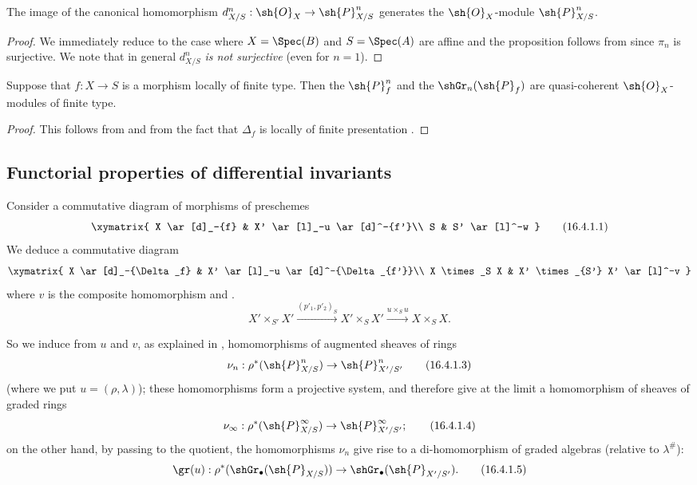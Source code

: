 \begin{proposition}[16.3.8]
\label{IV.16.3.8}
The image of the canonical homomorphism $d_{X/S}^n: \sh{O}_X \to \sh{P}_{X/S}^n$ generates the $\sh{O}_X$-module $\sh{P}_{X/S}^n$.
\end{proposition}

\begin{proof}
We immediately reduce to the case where $X = \Spec(B)$ and $S = \Spec(A)$ are affine and the proposition follows from  since $\pi_n$ is surjective.
We note that in general $d_{X/S}^n$ \emph{is not surjective} (even for $n = 1$).
\end{proof}

\begin{proposition}[16.3.9]
\label{IV.16.3.9}
Suppose that $f:X \to S$ is a morphism locally of finite type.
Then the $\sh{P}_{f}^n$ and the $\shGr_n(\sh{P}_{f})$ are quasi-coherent $\sh{O}_X$-modules of finite type.
\end{proposition}

\begin{proof}
This follows from  and from the fact that $\Delta_f$ is locally of finite presentation .
\end{proof}

\subsection{Functorial properties of differential invariants}
\label{IV.16.4}

\begin{env}[16.4.1]
\label{IV.16.4.1}
Consider a commutative diagram of morphisms of preschemes
\[
  \label{IV.16.4.1.1}
  \xymatrix{
    X \ar[d]_-{f} & X' \ar[l]_-u \ar[d]^-{f'}\\
    S & S' \ar[l]^-w
  }
  \tag{16.4.1.1}
\]
We deduce a commutative diagram
\[
  \xymatrix{
    X \ar[d]_-{\Delta_f} & X' \ar[l]_-u \ar[d]^-{\Delta_{f'}}\\
    X \times_S X & X' \times_{S'} X' \ar[l]^-v
  }
\]
where $v$ is the composite homomorphism  and .
\[
  \label{IV.16.4.1.2}
  X' \times_{S'} X' \xrightarrow{(p'_1, p'_2)_S} X' \times_{S} X' \xrightarrow{u \times_S u} X \times_S X.
  \tag{16.4.1.2}
\]

So we induce from $u$ and $v$, as explained in , homomorphisms of augmented sheaves of rings
\[
  \label{IV.16.4.1.3}
  \nu_n: \rho^*(\sh{P}_{X/S}^n) \to \sh{P}_{X'/S'}^n
  \tag{16.4.1.3}
\]
(where we put $u = (\rho,\lambda)$);
these homomorphisms form a projective system, and therefore give at the limit a homomorphism of sheaves of graded rings
\[
  \label{IV.16.4.1.4}
  \nu_\infty: \rho^*(\sh{P}_{X/S}^\infty) \to \sh{P}_{X'/S'}^\infty;
  \tag{16.4.1.4}
\]
on the other hand, by passing to the quotient, the homomorphisms $\nu_n$ give rise to a di-homomorphism of graded algebras (relative to $\lambda^\#$):
\[
  \label{IV.16.4.1.5}
  \gr(u): \rho^*(\shGr_\bullet(\sh{P}_{X/S})) \to \shGr_\bullet(\sh{P}_{X'/S'}).
  \tag{16.4.1.5}
\]
\end{env}

